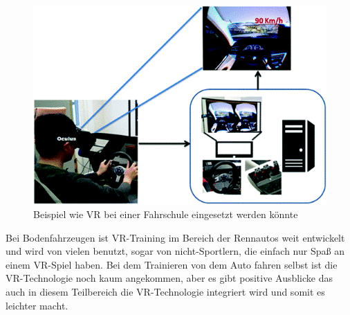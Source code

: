\begin{figure}[!ht]
    \centering
    \includegraphics[width=1.0\textwidth]{images/Abbildung 3.png}
    \caption{\label{fig:Abbildung 3}Beispiel wie VR bei einer Fahrschule eingesetzt werden könnte\cite{ihemedu2017virtual}\protect
    }
\end{figure}
Bei Bodenfahrzeugen ist VR-Training im Bereich der Rennautos weit entwickelt und wird von vielen benutzt, sogar von nicht-Sportlern, die einfach nur Spaß an einem VR-Spiel haben. Bei dem Trainieren von dem Auto fahren selbst ist die VR-Technologie noch kaum angekommen, aber es gibt positive Ausblicke das auch in diesem Teilbereich die VR-Technologie integriert wird und somit es leichter macht.
